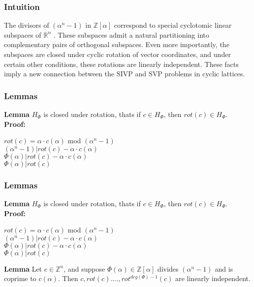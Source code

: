 \documentclass{beamer}
\begin{document}
\begin{frame}
\frametitle{Intuition}
The divisors of $(\alpha^n - 1)$ in $\mathbb{Z}[\alpha]$ correspond to special cyclotomic linear subspaces of $\mathbb{R}^n$ . These
subspaces admit a natural partitioning into complementary pairs of orthogonal subspaces. Even more importantly, the subspaces are closed under cyclic rotation of vector coordinates, and under certain other conditions, these rotations are linearly independent. These facts imply a new connection between the SIVP and SVP problems in cyclic lattices.
\end{frame}
\begin{frame}
\frametitle{Lemmas}
\textbf{Lemma} $H_\Phi$ is closed under rotation, thats if $c \in H_\Phi$, then $rot(c) \in H_\Phi$.
\\
\textbf{Proof:}
\\
{
\centering
$rot(c) = \alpha \cdot c(\alpha)$ mod $(\alpha^n - 1)$
\\
$(\alpha^n-1) | rot(c) - \alpha \cdot c(\alpha)$
\\
$\Phi(\alpha) | rot(c) - \alpha \cdot c(\alpha)$
\\
$\Phi(\alpha) | rot(c)$\par
}
\end{frame}
\begin{frame}
	\frametitle{Lemmas}
	\textbf{Lemma} $H_\Phi$ is closed under rotation, thats if $c \in H_\Phi$, then $rot(c) \in H_\Phi$.
	\\
	\textbf{Proof:}
	\\
	{
		\centering
		$rot(c) = \alpha \cdot c(\alpha)$ mod $(\alpha^n - 1)$
		\\
		$(\alpha^n-1) | rot(c) - \alpha \cdot c(\alpha)$
		\\
		$\Phi(\alpha) | rot(c) - \alpha \cdot c(\alpha)$
		\\
		$\Phi(\alpha) | rot(c)$\par
	}
	\textbf{Lemma} Let $c \in \mathbb{Z}^n$, and suppose $\Phi(\alpha) \in \mathbb{Z}[\alpha]$ divides $(\alpha^n-1)$ and is coprime to $c(\alpha)$. Then $c, rot(c)....,rot^{deg(\Phi)-1}(c)$ are linearly independent.
\end{frame}
\end{document}
